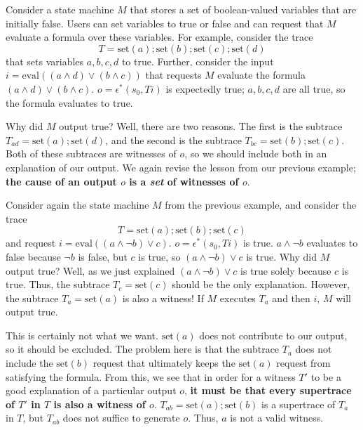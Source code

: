 \begin{example}
  \newcommand{\Mset}{\text{set}}
  \newcommand{\Meval}{\text{eval}}
  Consider a state machine $M$ that stores a set of boolean-valued variables
  that are initially false. Users can set variables to true or false and can
  request that $M$ evaluate a formula over these variables. For example,
  consider the trace
  \[
    T = \Mset(a); \Mset(b); \Mset(c); \Mset(d)
  \]
  that sets variables $a, b, c, d$ to true. Further, consider the input $i =
  \Meval((a \land d) \lor (b \land c))$ that requests $M$ evaluate the formula
  $(a \land d) \lor (b \land c)$. $o = \epsilon^*(s_0, Ti)$ is expectedly true;
  $a, b, c, d$ are all true, so the formula evaluates to true.

  Why did $M$ output true? Well, there are two reasons. The first is the
  subtrace $T_{ad} = \Mset(a); \Mset(d)$, and the second is the subtrace
  $T_{bc} = \Mset(b); \Mset(c)$. Both of these subtraces are witnesses of $o$,
  so we should include both in an explanation of our output. We again revise
  the lesson from our previous example; \textbf{the cause of an output $o$ is a
  \emph{set} of witnesses of $o$}.
\end{example}

\begin{example}
  \newcommand{\Mset}{\text{set}}
  \newcommand{\Meval}{\text{eval}}
  Consider again the state machine $M$ from the previous example, and consider
  the trace
  \[
    T = \Mset(a); \Mset(b); \Mset(c)
  \]
  and request $i = \Meval((a \land \lnot b) \lor c)$. $o = \epsilon^*(s_0, Ti)$
  is true. $a \land \lnot b$ evaluates to false because $\lnot b$ is false, but
  $c$ is true, so $(a \land \lnot b) \lor c$ is true.
  Why did $M$ output true? Well, as we just explained $(a \land \lnot b) \lor
  c$ is true solely because $c$ is true. Thus, the subtrace $T_c = \Mset(c)$
  should be the only explanation. However, the subtrace $T_a = \Mset(a)$ is
  also a witness! If $M$ executes $T_a$ and then $i$, $M$ will output true.

  This is certainly not what we want. $\Mset(a)$ does not contribute to our
  output, so it should be excluded. The problem here is that the subtrace $T_a$
  does not include the $\Mset(b)$ request that ultimately keeps the $\Mset(a)$
  request from satisfying the formula. From this, we see that in order for a
  witness $T'$ to be a good explanation of a particular output $o$, \textbf{it
    must be that every supertrace of $T'$ in $T$ is also a witness of $o$}.
    $T_{ab} = \Mset(a); \Mset(b)$ is a supertrace of $T_a$ in $T$, but $T_{ab}$
    does not suffice to generate $o$. Thus, $a$ is not a valid witness.
\end{example}

